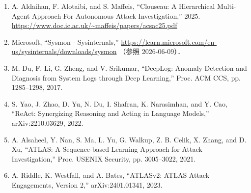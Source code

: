 \documentclass[dvipdfmx]{FITpaper}
\begin{document}
\begin{enumerate}
    \item A. Aldaihan, F. Alotaibi, and S. Maffeis,
    ``Clouseau: A Hierarchical Multi-Agent Approach For Autonomous Attack Investigation,''
    2025. \url{https://www.doc.ic.ac.uk/~maffeis/papers/acsac25.pdf}

    \item Microsoft,
    ``Sysmon - Sysinternals,''
    \url{https://learn.microsoft.com/en-us/sysinternals/downloads/sysmon}
    （参照 2026-06-09）．

    \item M. Du, F. Li, G. Zheng, and V. Srikumar,
    ``DeepLog: Anomaly Detection and Diagnosis from System Logs through Deep Learning,''
    Proc. ACM CCS, pp. 1285--1298, 2017.

    \item S. Yao, J. Zhao, D. Yu, N. Du, I. Shafran, K. Narasimhan, and Y. Cao,
    ``ReAct: Synergizing Reasoning and Acting in Language Models,''
    arXiv:2210.03629, 2022.

    \item A. Alsaheel, Y. Nan, S. Ma, L. Yu, G. Walkup, Z. B. Celik, X. Zhang, and D. Xu,
    ``ATLAS: A Sequence-based Learning Approach for Attack Investigation,''
    Proc. USENIX Security, pp. 3005--3022, 2021.

    \item A. Riddle, K. Westfall, and A. Bates,
    ``ATLASv2: ATLAS Attack Engagements, Version 2,''
    arXiv:2401.01341, 2023.
\end{enumerate}
\end{document}
